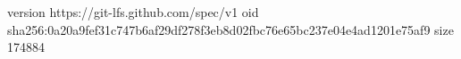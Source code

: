 version https://git-lfs.github.com/spec/v1
oid sha256:0a20a9fef31c747b6af29df278f3eb8d02fbc76e65bc237e04e4ad1201e75af9
size 174884
